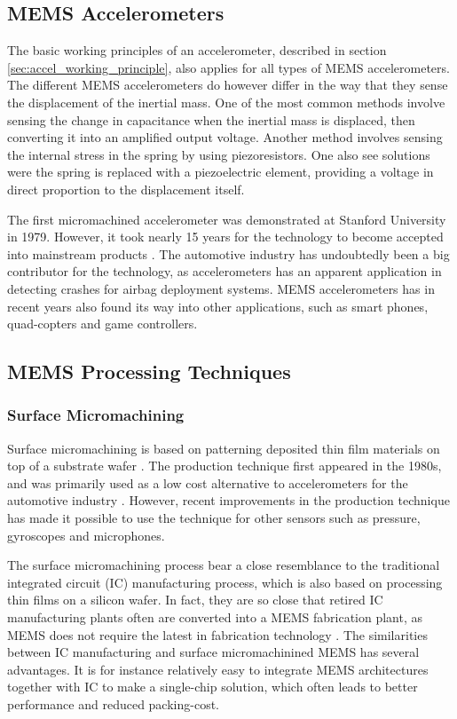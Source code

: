 \subsection{MEMS Accelerometers}

The basic working principles of an accelerometer, described in section \ref{sec:accel_working_principle}, also applies for all types of MEMS accelerometers. The different MEMS accelerometers do however differ in the way that they sense the displacement of the inertial mass. One of the most common methods involve sensing the change in capacitance when the inertial mass is displaced, then converting it into an amplified output voltage. Another method involves sensing the internal stress in the spring by using piezoresistors. One also see solutions were the spring is replaced with a piezoelectric element, providing a voltage in direct proportion to the displacement itself.

The first micromachined accelerometer was demonstrated at Stanford University in 1979. However, it took nearly 15 years for the technology to become accepted into mainstream products \cite[p.~8]{maluf04}. The automotive industry has undoubtedly been a big contributor for the technology, as accelerometers has an apparent application in detecting crashes for airbag deployment systems. MEMS accelerometers has in recent years also found its way into other applications, such as smart phones, quad-copters and game controllers. 

\subsection{MEMS Processing Techniques}

\subsubsection{Surface Micromachining}

Surface micromachining is based on patterning deposited thin film materials on top of a substrate wafer \cite[p.~5]{kaajakari09}. The production technique first appeared in the 1980s, and was primarily used as a low cost alternative to accelerometers for the automotive industry \cite[p.~101]{maluf04}. However, recent improvements in the production technique has made it possible to use the technique for other sensors such as pressure, gyroscopes and microphones. 

The surface micromachining process bear a close resemblance to the traditional integrated circuit (IC) manufacturing process, which is also based on processing thin films on a silicon wafer. In fact, they are so close that retired IC manufacturing plants often are converted into a MEMS fabrication plant, as MEMS does not require the latest in fabrication technology \cite[p.~4]{kaajakari09}. The similarities between IC manufacturing and surface micromachinined MEMS has several advantages. It is for instance relatively easy to integrate MEMS architectures together with IC to make a single-chip solution, which often leads to better performance and reduced packing-cost. 

